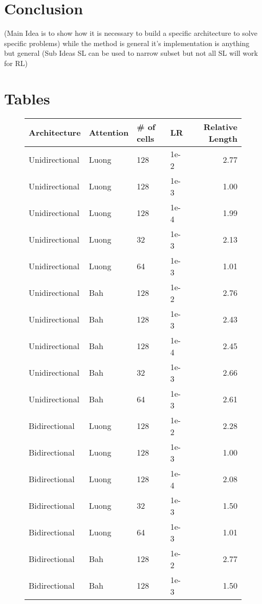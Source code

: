 \documentclass[12pt]{article}
\begin{document}

\section{Conclusion}
(Main Idea is to show how it is necessary to build a specific architecture to solve specific problems)
    while the method is general it's implementation is anything but general
    (Sub Ideas SL can be used to narrow subset but not all SL will work for RL)

\section*{Tables}

\begin{figure}[!p]
  \centering
  \begin{tabular}{l|l|l|l|r}
    Architecture & Attention & \# of cells & LR & Relative Length\\
    \hline
    Unidirectional & Luong & 128 & 1e-2 & 2.77\\
    Unidirectional & Luong & 128 & 1e-3 & 1.00\\ %
    Unidirectional & Luong & 128 & 1e-4 & 1.99\\
    Unidirectional & Luong & 32 & 1e-3 & 2.13\\
    Unidirectional & Luong & 64 & 1e-3 & 1.01\\
    Unidirectional & Bah & 128 & 1e-2 & 2.76\\
    Unidirectional & Bah & 128 & 1e-3 & 2.43\\
    Unidirectional & Bah & 128 & 1e-4 & 2.45\\
    Unidirectional & Bah & 32 & 1e-3 & 2.66\\
    Unidirectional & Bah & 64 & 1e-3 & 2.61\\
    Bidirectional & Luong & 128 & 1e-2 & 2.28\\
    Bidirectional & Luong & 128 & 1e-3 & 1.00\\ %
    Bidirectional & Luong & 128 & 1e-4 & 2.08\\
    Bidirectional & Luong & 32 & 1e-3 & 1.50\\
    Bidirectional & Luong & 64 & 1e-3 & 1.01\\
    Bidirectional & Bah & 128 & 1e-2 & 2.77\\
    Bidirectional & Bah & 128 & 1e-3 & 1.50\\

\end{tabular}
\end{figure}
\end{document}
